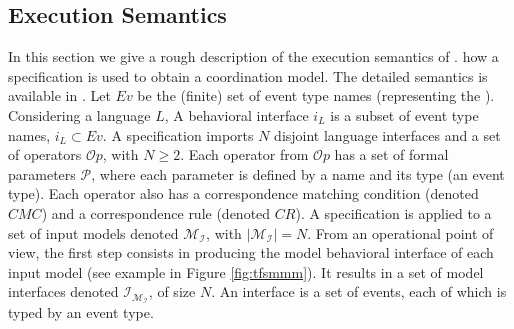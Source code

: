 \subsection{Execution Semantics}
In this section we give a rough description of the execution semantics of \bcool. \ie how a \bcool specification is used to obtain a coordination model. The detailed semantics is available in \cite{D3.1.2}. 
%
Let $Ev$ be the (finite) set of event type names (representing the \dse). Considering a language $L$, A behavioral interface $i_L$ is a subset of event type names, $i_L \subset Ev$. A \bcool specification imports $N$ disjoint language interfaces and a set of operators $\mathcal{O}p$, with $N\geq 2$. 
Each operator from $\mathcal{O}p$ has a set of formal parameters $\mathcal{P}$, where each parameter is defined by a name and its type (\ie an event type). 
Each operator also has a correspondence matching condition (denoted $CMC$) and a correspondence rule (denoted $CR$).
%
A \bcool specification is applied to a set of input models denoted $\mathcal{M_I}$, with $|\mathcal{M_I}| = N$.
%
From an operational point of view, the first step consists in producing the model behavioral interface of each input model (see example in Figure \ref{fig:tfsmmm}). It results in a set of model interfaces denoted $\mathcal{I_{M_I}}$, of size $N$. An interface is a set of events, each of which is typed by an event type.
%
%
